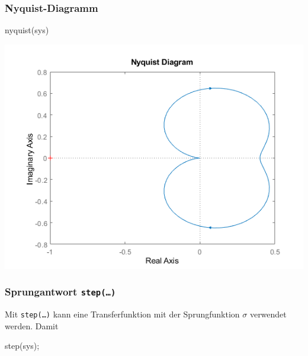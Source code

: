 \documentclass[
  10pt,
  a4paper,
  german]{article}
\newenvironment{Shaded}{}{}
\newcommand{\NormalTok}[1]{\textcolor[rgb]{0.14,0.16,0.18}{#1}}
\newcommand{\OperatorTok}[1]{\textcolor[rgb]{0.14,0.16,0.18}{#1}}
\newcommand{\VariableTok}[1]{\textcolor[rgb]{0.89,0.38,0.04}{#1}}
\numberwithin{equation}{section}
\begin{document}
\begin{multicols}{2}
{\subsubsection{Nyquist-Diagramm}\label{nyquist-diagramm}}

\begin{Shaded}
\begin{Highlighting}[]
\VariableTok{nyquist}\NormalTok{(}\VariableTok{sys}\NormalTok{)}
\end{Highlighting}
\end{Shaded}

\includegraphics{images/matlab_NyquistPlotResponse.png.png}

\hypertarget{sprungantwort-step}{%
\subsubsection{\texorpdfstring{Sprungantwort
\texttt{step(…)}}{Sprungantwort step(\ldots)}}\label{sprungantwort-step}}

Mit \texttt{step(…)} kann eine Transferfunktion mit der Sprungfunktion
\(\sigma\) verwendet werden. Damit

\begin{Shaded}
\begin{Highlighting}[]
\VariableTok{step}\NormalTok{(}\VariableTok{sys}\NormalTok{)}\OperatorTok{;}
\end{Highlighting}
\end{Shaded}


\end{multicols}
\end{document}

